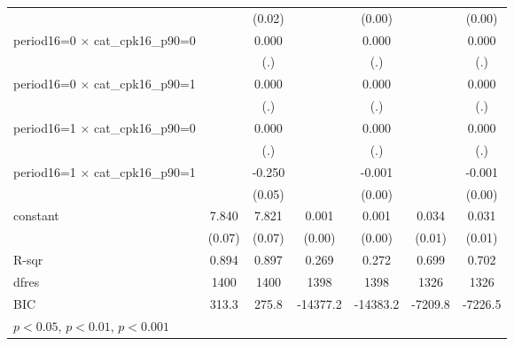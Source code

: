 {\begin{tabular}{l*{6}{c}}
                    &                     &      (0.02)         &                     &      (0.00)         &                     &      (0.00)         \\
period16=0 $\times$ cat\_cpk16\_p90=0&                     &       0.000         &                     &       0.000         &                     &       0.000         \\
                    &                     &         (.)         &                     &         (.)         &                     &         (.)         \\
period16=0 $\times$ cat\_cpk16\_p90=1&                     &       0.000         &                     &       0.000         &                     &       0.000         \\
                    &                     &         (.)         &                     &         (.)         &                     &         (.)         \\
period16=1 $\times$ cat\_cpk16\_p90=0&                     &       0.000         &                     &       0.000         &                     &       0.000         \\
                    &                     &         (.)         &                     &         (.)         &                     &         (.)         \\
period16=1 $\times$ cat\_cpk16\_p90=1&                     &      -0.250\sym{***}&                     &      -0.001         &                     &      -0.001         \\
                    &                     &      (0.05)         &                     &      (0.00)         &                     &      (0.00)         \\
constant            &       7.840\sym{***}&       7.821\sym{***}&       0.001         &       0.001         &       0.034\sym{***}&       0.031\sym{***}\\
                    &      (0.07)         &      (0.07)         &      (0.00)         &      (0.00)         &      (0.01)         &      (0.01)         \\
\hline
R-sqr               &       0.894         &       0.897         &       0.269         &       0.272         &       0.699         &       0.702         \\
dfres               &        1400         &        1400         &        1398         &        1398         &        1326         &        1326         \\
BIC                 &       313.3         &       275.8         &    -14377.2         &    -14383.2         &     -7209.8         &     -7226.5         \\
\hline\hline
\multicolumn{7}{l}{\footnotesize \sym{*} \(p<0.05\), \sym{**} \(p<0.01\), \sym{***} \(p<0.001\)}\\
\end{tabular}
}
